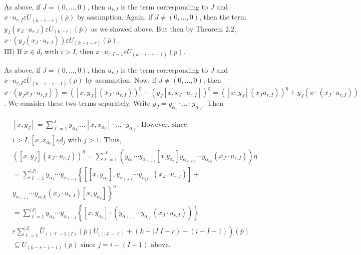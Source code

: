 \documentclass[10pt]{article}
\begin{document}
As above, if $J=(0, \ldots, 0)$, then $u_{r, I}$ is the term corresponding to $J$ and $x \cdot u_{r, I} \varepsilon U_{(k-i-r)}(\bar{\rho})$ by assumption. Again, if $J \neq(0, \ldots, 0)$, then the term $y_{J}\left(x_{J} \cdot u_{r, I}\right) \varepsilon U_{(k-r)}(\bar{p})$ as we showed above. But then by Theorem 2.2, $x \cdot\left(y_{J}\left(x_{J} \cdot u_{r, I}\right)\right) \varepsilon U_{(k-i-r)}(\bar{\rho})$.\\
III) If $x \in d_{i}$ with $i>I$, then $x \cdot u_{r, I-1} \varepsilon U_{(k-i-r-1)}(\bar{p})$.

As above, if $J=(0, \ldots, 0)$, then $u_{r, I}$ is the term corresponding to $J$ and $x \cdot u_{r, I} \varepsilon U_{(k-i-r-1)}(\bar{p})$ by assumption. Now, if $J \neq(0, \ldots, 0)$, then $\left.x \cdot\left(y_{J} x_{J} \cdot u_{r, I}\right)\right)= \left(\left[x, y_{J}\right]\left(x_{J} \cdot u_{r, I}\right)\right)^{\eta}+\left(y_{J}\left[x, x_{J} \cdot u_{r, I}\right]\right)^{\eta}=\left(\left[x, y_{J}\right]\left(x_{J} u_{r, I}\right)\right)^{\eta}+ y_{J}\left(x \cdot\left(x_{J} \cdot u_{r, I}\right)\right)$. We consider these two terms separately. Write $y_{J}=y_{\alpha_{1}} \cdot \ldots \cdot y_{\alpha_{|J|}}$. Then

$$
\begin{aligned}
& {\left[x, y_{J}\right]=\sum_{\ell=1}^{J} y_{\alpha_{1}} \ldots .\left[x, x_{\alpha_{\ell}}\right] \cdot \ldots \cdot y_{\alpha_{|J|}} \text {. However, since }} \\
& i>I,\left[x, x_{\alpha_{\ell}}\right] \varepsilon d_{j} \text { with } j>1 \text {. Thus, } \\
& \left(\left[x, y_{J}\right]\left(x_{J} \cdot u_{r, I}\right)\right)^{\eta}=\sum_{\ell=1}^{|J|}\left(y_{\alpha_{1}} \cdots y_{\alpha_{\ell-1}}\left[x_{,} y_{\alpha_{\ell}}\right] y_{\alpha_{\ell+1}} \cdots y_{\alpha_{|J|}}\left(x_{J} \cdot u_{r, I}\right)\right) \eta \\
& =\sum_{\ell=1}^{|J|} y_{\alpha_{1}} \cdots y_{\alpha_{\ell-1}}\left\{\left[\left[x, y_{\alpha_{\ell}}\right], y_{\alpha_{\ell+1}} \cdots y_{\alpha_{\mid J} \mid}\left(x_{J} \cdot u_{r, I}\right)\right]+\right. \\
& \left.y_{\alpha_{\ell+1}} \cdots y_{\alpha|J|}\left(x_{J} \cdot u_{r, I}\right)\left[x, y_{\alpha_{\ell}}\right]\right\}^{\eta} \\
& =\sum_{\ell=1}^{|J|} y_{\alpha_{1}} \cdots y_{\alpha_{\ell-1}}\left\{\left[x, y_{\alpha_{\ell}}\right] \cdot\left(y_{\alpha_{\ell+1}} \cdots y_{\alpha_{|J|}}\left(x_{J} \cdot u_{r, I}\right)\right)\right\} \\
& \left.\varepsilon \sum_{\ell=1}^{|J|} \hat{U}_{((\ell-1) I)}(\bar{p}) U_{((|J|-\ell)}+(k-|J| I-r)-(i-I+1)\right)(\bar{p}) \\
& \subseteq U_{(k-r-i-1)}(\bar{p}) \text { since } j=i-(I-1) \text { above. }
\end{aligned}
$$
\end{document}
